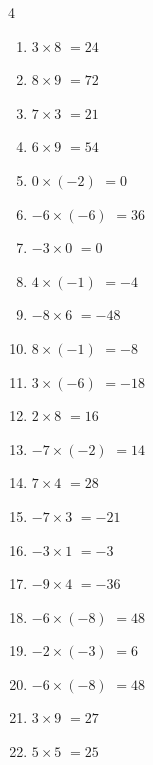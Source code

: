 \begin{multicols}{4}
\begin{enumerate}
  \item $3\times 8$
        $=24$

  \item $8\times 9$
        $=72$

  \item $7\times 3$
        $=21$

  \item $6\times 9$
        $=54$

  \item $0\times (-2)$
        $=0$

  \item $-6\times (-6)$
        $=36$

  \item $-3\times 0$
        $=0$

  \item $4\times (-1)$
        $=-4$

  \item $-8\times 6$
        $=-48$

  \item $8\times (-1)$
        $=-8$

  \item $3\times (-6)$
        $=-18$

  \item $2\times 8$
        $=16$

  \item $-7\times (-2)$
        $=14$

  \item $7\times 4$
        $=28$

  \item $-7\times 3$
        $=-21$

  \item $-3\times 1$
        $=-3$

  \item $-9\times 4$
        $=-36$

  \item $-6\times (-8)$
        $=48$

  \item $-2\times (-3)$
        $=6$

  \item $-6\times (-8)$
        $=48$

\columnbreak %

  \item $3\times 9$
        $=27$

  \item $5\times 5$
        $=25$


\end{enumerate}
\end{multicols}
